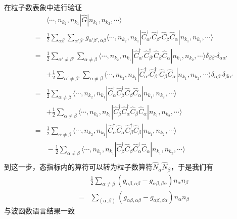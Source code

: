\documentclass[12pt, a4paper, oneside, UTF8]{ctexbook}
\begin{document}
在粒子数表象中进行验证
\begin{eqnarray}
    &&\langle\cdots,n_{k_2},n_{k_1}|\hat{G}|n_{k_1},n_{k_2},\cdots\rangle\\\nonumber
    &=&\frac{1}{2}\sum_{\alpha\beta}\sum_{\alpha'\beta'}g_{\alpha'\beta',\alpha\beta}\langle\cdots,n_{k_2},n_{k_1}|\hat{C}^{\dag}_{\alpha'}\hat{C}^{\dag}_{\beta'}\hat{C}_{\beta}\hat{C}_{\alpha}|n_{k_1},n_{k_2},\cdots\rangle\\\nonumber
    &=&\frac{1}{2}\sum_{\alpha'\neq\beta'}\sum_{\alpha\neq\beta}\langle\cdots,n_{k_2},n_{k_1}|\hat{C}^{\dag}_{\alpha'}\hat{C}^{\dag}_{\beta'}\hat{C}_{\beta}\hat{C}_{\alpha}|n_{k_1},n_{k_2},\cdots\rangle\delta_{\beta\beta'}\delta_{\alpha\alpha'}\\\nonumber
    &&+\frac{1}{2}\sum_{\alpha'\neq\beta'}\sum_{\alpha\neq\beta}\langle\cdots,n_{k_2},n_{k_1}|\hat{C}^{\dag}_{\alpha'}\hat{C}^{\dag}_{\beta'}\hat{C}_{\beta}\hat{C}_{\alpha}|n_{k_1},n_{k_2},\cdots\rangle\delta_{\alpha\beta'}\delta_{\beta\alpha'}\\\nonumber
    &=&\frac{1}{2}\sum_{\alpha\neq\beta}\langle\cdots,n_{k_2},n_{k_1}|\hat{C}^{\dag}_{\alpha}\hat{C}^{\dag}_{\beta}\hat{C}_{\beta}\hat{C}_{\alpha}|n_{k_1},n_{k_2},\cdots\rangle\\\nonumber
    &&+\frac{1}{2}\sum_{\alpha\neq\beta}\langle\cdots,n_{k_2},n_{k_1}|\hat{C}^{\dag}_{\beta}\hat{C}^{\dag}_{\alpha}\hat{C}_{\beta}\hat{C}_{\alpha}|n_{k_1},n_{k_2},\cdots\rangle\\\nonumber
    &=&\frac{1}{2}\sum_{\alpha\neq\beta}\langle\cdots,n_{k_2},n_{k_1}|\hat{C}^{\dag}_{\alpha}\hat{C}_{\alpha}\hat{C}^{\dag}_{\beta}\hat{C}_{\beta}|n_{k_1},n_{k_2},\cdots\rangle\\\nonumber
    &&\boxed{-}\frac{1}{2}\sum_{\alpha\neq\beta}\langle\cdots,n_{k_2},n_{k_1}|\hat{C}^{\dag}_{\beta}\hat{C}_{\beta}\hat{C}^{\dag}_{\alpha}\hat{C}_{\alpha}|n_{k_1},n_{k_2},\cdots\rangle\\\nonumber
\end{eqnarray}
到这一步，态指标内的算符可以转为粒子数算符$\hat{N}_\alpha\hat{N}_\beta$，于是我们有
\begin{eqnarray}
    &&\frac{1}{2}\sum_{\alpha\neq\beta}(g_{\alpha\beta,\alpha\beta}-g_{\alpha\beta,\beta\alpha})n_\alpha n_\beta\\\nonumber
    &=&\sum_{(\alpha,\beta)}(g_{\alpha\beta,\alpha\beta}-g_{\alpha\beta,\beta\alpha})n_\alpha n_\beta
\end{eqnarray}
与波函数语言结果一致
\end{document}
